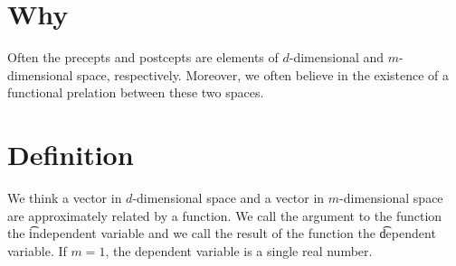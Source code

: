 
\section*{Why}

Often the precepts and postcepts are elements of $d$-dimensional and $m$-dimensional space, respectively.
Moreover, we often believe in the existence of a functional prelation between these two spaces.

\section*{Definition}

We think a vector in $d$-dimensional space and a vector in $m$-dimensional space are approximately related by a function.
We call the argument to the function the \t{independent variable} and we call the result of the function the \t{dependent variable}.
If $m = 1$, the dependent variable is a single real number.

\blankpage